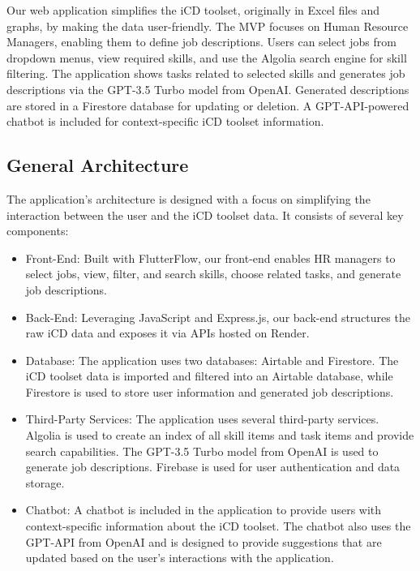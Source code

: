 
Our web application simplifies the iCD toolset, originally in Excel files and graphs, by making the data user-friendly. The MVP focuses on Human Resource Managers, enabling them to define job descriptions. Users can select jobs from dropdown menus, view required skills, and use the Algolia search engine for skill filtering. The application shows tasks related to selected skills and generates job descriptions via the GPT-3.5 Turbo model from OpenAI. Generated descriptions are stored in a Firestore database for updating or deletion. A GPT-API-powered chatbot is included for context-specific iCD toolset information.


\subsection{General Architecture}

The application's architecture is designed with a focus on simplifying the interaction between the user and the iCD toolset data. It consists of several key components:

\begin{itemize}
    \item Front-End: Built with FlutterFlow, our front-end enables HR managers to select jobs, view, filter, and search skills, choose related tasks, and generate job descriptions.
    \item Back-End: Leveraging JavaScript and Express.js, our back-end structures the raw iCD data and exposes it via APIs hosted on Render.
    \item Database: The application uses two databases: Airtable and Firestore. The iCD toolset data is imported and filtered into an Airtable database, while Firestore is used to store user information and generated job descriptions.
    \item Third-Party Services: The application uses several third-party services. Algolia is used to create an index of all skill items and task items and provide search capabilities. The GPT-3.5 Turbo model from OpenAI is used to generate job descriptions. Firebase is used for user authentication and data storage.
    \item Chatbot: A chatbot is included in the application to provide users with context-specific information about the iCD toolset. The chatbot also uses the GPT-API from OpenAI and is designed to provide suggestions that are updated based on the user's interactions with the application.
\end{itemize}



